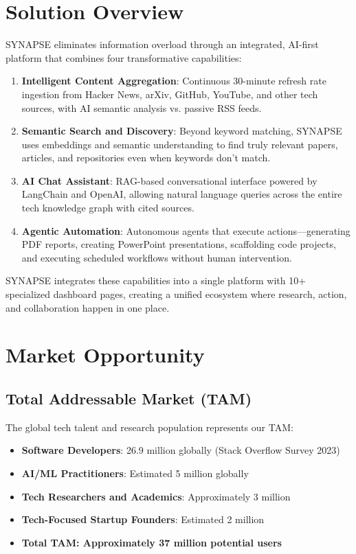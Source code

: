 \documentclass{report}
\begin{document}
\section{Solution Overview}

SYNAPSE eliminates information overload through an integrated, AI-first platform that combines four transformative capabilities:

\begin{enumerate}
    \item \textbf{Intelligent Content Aggregation}: Continuous 30-minute refresh rate ingestion from Hacker News, arXiv, GitHub, YouTube, and other tech sources, with AI semantic analysis vs. passive RSS feeds.
    
    \item \textbf{Semantic Search and Discovery}: Beyond keyword matching, SYNAPSE uses embeddings and semantic understanding to find truly relevant papers, articles, and repositories even when keywords don't match.
    
    \item \textbf{AI Chat Assistant}: RAG-based conversational interface powered by LangChain and OpenAI, allowing natural language queries across the entire tech knowledge graph with cited sources.
    
    \item \textbf{Agentic Automation}: Autonomous agents that execute actions---generating PDF reports, creating PowerPoint presentations, scaffolding code projects, and executing scheduled workflows without human intervention.
\end{enumerate}

SYNAPSE integrates these capabilities into a single platform with 10+ specialized dashboard pages, creating a unified ecosystem where research, action, and collaboration happen in one place.

\section{Market Opportunity}

\subsection{Total Addressable Market (TAM)}

The global tech talent and research population represents our TAM:

\begin{itemize}
    \item \textbf{Software Developers}: 26.9 million globally (Stack Overflow Survey 2023)
    \item \textbf{AI/ML Practitioners}: Estimated 5 million globally
    \item \textbf{Tech Researchers and Academics}: Approximately 3 million
    \item \textbf{Tech-Focused Startup Founders}: Estimated 2 million
    \item \textbf{\textbf{Total TAM}: Approximately 37 million potential users}
\end{itemize}
\end{document}
